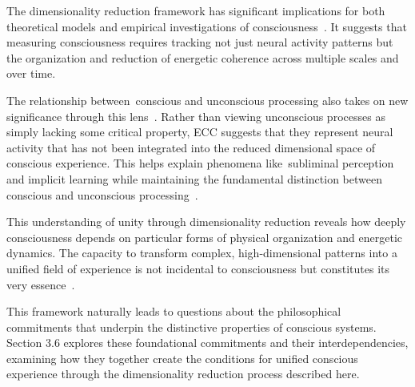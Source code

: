 The dimensionality reduction framework has significant implications for both theoretical models and empirical investigations of consciousness~\cite{seth2021being,butlin2023consciousnessartificialintelligenceinsights}. It suggests that measuring consciousness requires tracking not just neural activity patterns but the organization and reduction of energetic coherence across multiple scales and over time.

The relationship between~conscious and unconscious processing also takes on new significance through this lens~\cite{dehaene2011experimental,mashour2020conscious}. Rather than viewing unconscious processes as simply lacking some critical property, ECC suggests that they represent neural activity that has not been integrated into the reduced dimensional space of conscious experience. This helps explain phenomena like~subliminal perception and implicit learning while maintaining the fundamental distinction between conscious and unconscious processing~\cite{van2025processes,amil2024theta}.

This understanding of unity through dimensionality reduction reveals how deeply consciousness depends on particular forms of physical organization and energetic dynamics. The capacity to transform complex, high-dimensional patterns into a unified field of experience is not incidental to consciousness but constitutes its very essence~\cite{bayne2010unity,thompson2010mind}.

This framework naturally leads to questions about the philosophical commitments that underpin the distinctive properties of conscious systems. Section 3.6 explores these foundational commitments and their interdependencies, examining how they together create the conditions for unified conscious experience through the dimensionality reduction process described here.
